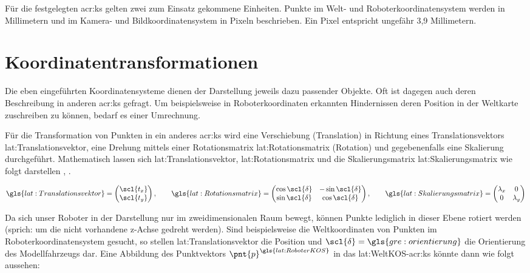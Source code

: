 Für die festgelegten \gls{acr:ks} gelten zwei zum Einsatz gekommene Einheiten. Punkte im Welt- und Roboterkoordinatensystem werden in Millimetern und im Kamera- und Bildkoordinatensystem in Pixeln beschrieben. Ein Pixel entspricht ungefähr 3,9 Millimetern.

\section{Koordinatentransformationen \dcfirstauthorshort}

Die eben eingeführten Koordinatensysteme dienen der Darstellung jeweils dazu passender Objekte. Oft ist dagegen auch deren Beschreibung in anderen \gls{acr:ks} gefragt. Um beispielsweise in Roboterkoordinaten erkannten Hindernissen deren Position in der Weltkarte zuschreiben zu können, bedarf es einer Umrechnung. 

Für die Transformation von Punkten in ein anderes \gls{acr:ks} wird eine Verschiebung (Translation) in Richtung eines Translationsvektors \gls{lat:Translationsvektor}, eine Drehung mittels einer Rotationsmatrix \gls{lat:Rotationsmatrix} (Rotation) und gegebenenfalls eine Skalierung durchgeführt.
Mathematisch lassen sich \gls{lat:Translationsvektor}, \gls{lat:Rotationsmatrix} und die Skalierungsmatrix \gls{lat:Skalierungsmatrix} wie folgt darstellen \autocite[S.~26f]{corkeRoboticsVisionControl2017}, \autocite[S.~133]{nischwitzComputergrafik2011}.

\begin{equation}
\gls{lat:Translationsvektor} = 
\begin{pmatrix}
\scl{t_x} 	\\
\scl{t_y} 	\\
\end{pmatrix}
, \qquad
\gls{lat:Rotationsmatrix} = 
\begin{pmatrix}
\cos{\scl{\delta}} & -\sin{\scl{\delta}} 	\\
\sin{\scl{\delta}} & \cos{\scl{\delta}} 	\\
\end{pmatrix}
, \qquad
\gls{lat:Skalierungsmatrix} =
\begin{pmatrix}
\lambda_x 	& 0 		\\
0 			& \lambda_y 	\\
\end{pmatrix}
\end{equation} 

Da sich unser Roboter in der Darstellung nur im zweidimensionalen Raum bewegt, können Punkte lediglich in dieser Ebene rotiert werden (sprich: um die nicht vorhandene \gls{z}-Achse gedreht werden). 
Sind beispielsweise die Weltkoordinaten von Punkten im Roboterkoordinatensystem gesucht, so stellen \gls{lat:Translationsvektor} die Position und \( \scl{\delta} = \gls{gre:orientierung} \) die Orientierung des Modellfahrzeugs dar.
Eine Abbildung des Punktvektors \( \pnt{p}^{\gls{lat:RoboterKOS}} \) in das \gls{lat:WeltKOS}-\gls{acr:ks} könnte dann wie folgt aussehen:

